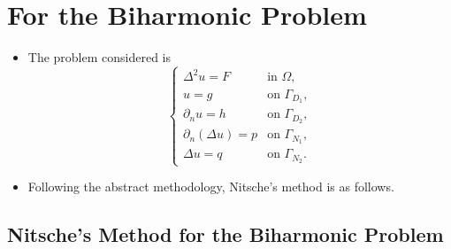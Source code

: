 \documentclass[11pt,a4paper]{article}
\begin{document}
\newpage

\section*{For the Biharmonic Problem}

\begin{itemize}
    \item The problem considered is
    \[
    \begin{cases}
       \Delta^2u=F &\text{in }\Omega,\\
       u=g &\text{on }\Gamma_{D_1},\\
       \partial_n u=h &\text{on }\Gamma_{D_2},\\
       \partial_n(\Delta u)=p &\text{on }\Gamma_{N_1},\\
       \Delta u=q &\text{on }\Gamma_{N_2}.
    \end{cases}
    \]

    \item Following the abstract methodology, Nitsche's method is as follows.
\end{itemize}

\subsection{Nitsche's Method for the Biharmonic Problem}
\end{document}
